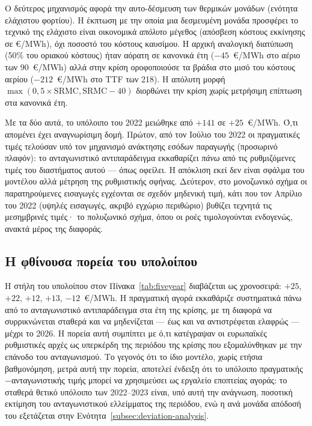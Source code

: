 Ο δεύτερος μηχανισμός αφορά την αυτο-δέσμευση των θερμικών μονάδων
(ενότητα ελάχιστου φορτίου). Η έκπτωση με την οποία μια δεσμευμένη μονάδα
προσφέρει το τεχνικό της ελάχιστο είναι οικονομικά \emph{απόλυτο} μέγεθος
(απόσβεση κόστους εκκίνησης σε €/MWh), όχι ποσοστό του κόστους καυσίμου. Η
αρχική αναλογική διατύπωση (50\% του οριακού κόστους) ήταν αόρατη σε
κανονικά έτη ($-45$~€/MWh στο αέριο των 90~€/MWh) αλλά στην κρίση
οροφοποιούσε τα βράδια στο μισό του κόστους αερίου ($-212$~€/MWh στο TTF
των 218). Η απόλυτη μορφή $\max(0{,}5\times\mathrm{SRMC},
\mathrm{SRMC}-40)$ διορθώνει την κρίση χωρίς μετρήσιμη επίπτωση στα
κανονικά έτη.

Με τα δύο αυτά, το υπόλοιπο του 2022 μειώθηκε από $+141$ σε $+25$~€/MWh.
Ό,τι απομένει έχει αναγνωρίσιμη δομή. Πρώτον, από τον Ιούλιο του 2022 οι
πραγματικές τιμές τελούσαν υπό τον μηχανισμό ανάκτησης εσόδων παραγωγής
(προσωρινό πλαφόν): το ανταγωνιστικό αντιπαράδειγμα εκκαθαρίζει
\emph{πάνω} από τις ρυθμιζόμενες τιμές του διαστήματος αυτού --- όπως
οφείλει. Η απόκλιση εκεί δεν είναι σφάλμα του μοντέλου αλλά μέτρηση της
ρυθμιστικής σφήνας. Δεύτερον, στο μονοζωνικό σχήμα οι παρατηρούμενες
εισαγωγές εγχέονται σε σχεδόν μηδενική τιμή, κάτι που τον Απρίλιο του 2022
(υψηλές εισαγωγές, ακριβό εγχώριο περιθώριο) βυθίζει τεχνητά τις
μεσημβρινές τιμές· το πολυζωνικό σχήμα, όπου οι ροές τιμολογούνται
ενδογενώς, ανακτά μέρος της διαφοράς.

\subsection{Η φθίνουσα πορεία του υπολοίπου}
\label{subsec:residual-decay}

Η στήλη του υπολοίπου στον Πίνακα~\ref{tab:fiveyear} διαβάζεται ως
χρονοσειρά: $+25$, $+22$, $+12$, $+13$, $-12$~€/MWh. Η πραγματική αγορά
εκκαθάριζε συστηματικά πάνω από το ανταγωνιστικό αντιπαράδειγμα στα έτη
της κρίσης, με τη διαφορά να συρρικνώνεται σταθερά και να μηδενίζεται ---
έως και να αντιστρέφεται ελαφρώς --- μέχρι το 2026. Η πορεία αυτή συμπίπτει
με ό,τι κατέγραψαν οι ευρωπαϊκές ρυθμιστικές αρχές ως υπερκέρδη της
περιόδου της κρίσης που εξομαλύνθηκαν με την επάνοδο του ανταγωνισμού. Το
γεγονός ότι το ίδιο μοντέλο, χωρίς ετήσια βαθμονόμηση, μετρά αυτή την
πορεία, αποτελεί ένδειξη ότι το υπόλοιπο πραγματικής$-$ανταγωνιστικής
τιμής μπορεί να χρησιμεύσει ως εργαλείο εποπτείας αγοράς: το σταθερά
θετικό υπόλοιπο των 2022--2023 είναι, υπό αυτή την ανάγνωση, ποσοτική
εκτίμηση του ανταγωνιστικού ελλείμματος της περιόδου, ενώ η ανά μονάδα
απόδοσή του εξετάζεται στην Ενότητα~\ref{subsec:deviation-analysis}.

